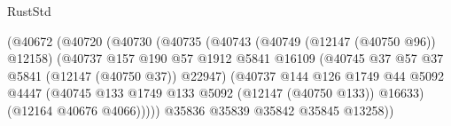 \begin{lexlean}{RustStd}
\begin{coremodule}
                                              (@40672
                                                (@40720
                                                  (@40730
                                                    (@40735
                                                      (@40743
                                                        (@40749 (@12147 (@40750 @96)) @12158)
                                                        (@40737
                                                          @157
                                                          @190
                                                          @57
                                                          @1912
                                                          @5841
                                                          @16109
                                                          (@40745
                                                            @37
                                                            @57
                                                            @37
                                                            @5841
                                                            (@12147 (@40750 @37))
                                                            @22947)
                                                          (@40737
                                                            @144
                                                            @126
                                                            @1749
                                                            @44
                                                            @5092
                                                            @4447
                                                            (@40745
                                                              @133
                                                              @1749
                                                              @133
                                                              @5092
                                                              (@12147 (@40750 @133))
                                                              @16633)
                                                            (@12164 @40676 @4066)))))
                                                    @35836
                                                    @35839
                                                    @35842
                                                    @35845
                                                    @13258))

\end{coremodule}
\end{lexlean}
